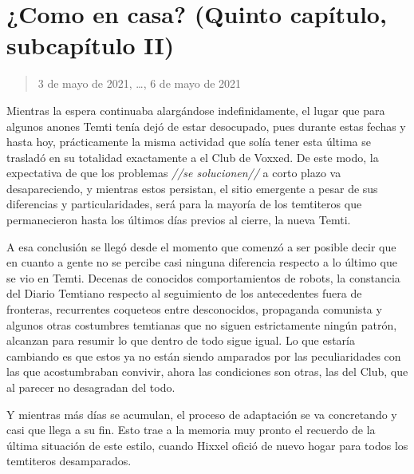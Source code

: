 \documentclass[
  spanish,
]{book}
\begin{document}
\hypertarget{como-en-casa-quinto-capuxedtulo-subcapuxedtulo-ii}{%
\section{¿Como en casa? (Quinto capítulo, subcapítulo II)}\label{como-en-casa-quinto-capuxedtulo-subcapuxedtulo-ii}}

\begin{quote}
3 de mayo de 2021, \ldots, 6 de mayo de 2021
\end{quote}

Mientras la espera continuaba alargándose indefinidamente, el lugar que para algunos anones Temti tenía dejó de estar desocupado, pues durante estas fechas y hasta hoy, prácticamente la misma actividad que solía tener esta última se trasladó en su totalidad exactamente a el Club de Voxxed. De este modo, la expectativa de que los problemas \emph{//se solucionen//} a corto plazo va desapareciendo, y mientras estos persistan, el sitio emergente a pesar de sus diferencias y particularidades, será para la mayoría de los temtiteros que permanecieron hasta los últimos días previos al cierre, la nueva Temti.

A esa conclusión se llegó desde el momento que comenzó a ser posible decir que en cuanto a gente no se percibe casi ninguna diferencia respecto a lo último que se vio en Temti. Decenas de conocidos comportamientos de robots, la constancia del Diario Temtiano respecto al seguimiento de los antecedentes fuera de fronteras, recurrentes coqueteos entre desconocidos, propaganda comunista y algunos otras costumbres temtianas que no siguen estrictamente ningún patrón, alcanzan para resumir lo que dentro de todo sigue igual. Lo que estaría cambiando es que estos ya no están siendo amparados por las peculiaridades con las que acostumbraban convivir, ahora las condiciones son otras, las del Club, que al parecer no desagradan del todo.

Y mientras más días se acumulan, el proceso de adaptación se va concretando y casi que llega a su fin. Esto trae a la memoria muy pronto el recuerdo de la última situación de este estilo, cuando Hixxel ofició de nuevo hogar para todos los temtiteros desamparados.
\end{document}
